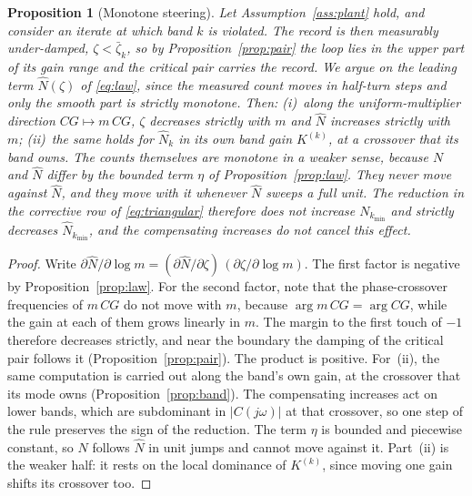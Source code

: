 \documentclass[final,3p,times,twocolumn]{elsarticle}
\newcommand{\fix}[1]{#1}  %
\newtheorem{proposition}{Proposition}
\begin{document}
\begin{proposition}[Monotone steering]\label{prop:mono}
Let Assumption~\ref{ass:plant} hold, and consider an iterate at which
band $k$ is violated. The record is then measurably under-damped,
$\zeta < \bar\zeta_k$, so by Proposition~\ref{prop:pair} the loop lies in
the upper part of its gain range and the critical pair carries the
record. \fix{We argue on the leading term $\hat N(\zeta)$ of \eqref{eq:law},
since the measured count moves in half-turn steps and only the smooth
part is strictly monotone.} Then: (i)~along the uniform-multiplier
direction $CG \mapsto m\,CG$, \fix{$\zeta$ decreases strictly with $m$
and $\hat N$ increases strictly with $m$};
(ii)~\fix{the same holds for $\hat N_k$ in} its own band gain
$K^{(k)}$, at a crossover that its band owns. \fix{The counts
themselves are monotone in a weaker sense, because $N$ and $\hat N$
differ by the bounded term $\eta$ of Proposition~\ref{prop:law}. They
never move against $\hat N$, and they move with it whenever $\hat N$
sweeps a full unit.} The reduction in the corrective row of
\eqref{eq:triangular} therefore \fix{does not increase}
$N_{k_{\min}}$\fix{ and strictly decreases $\hat N_{k_{\min}}$}, and the
compensating increases do not cancel this effect.
\end{proposition}

\begin{proof}
Write $\partial \fix{\hat N}/\partial\log m =
(\partial \fix{\hat N}/\partial\zeta)\,(\partial\zeta/\partial\log m)$.
The first factor is negative by Proposition~\ref{prop:law}. For the
second factor, note that the phase-crossover frequencies of $m\,CG$ do
not move with $m$, because $\arg m\,CG = \arg CG$, while the gain at
each of them grows linearly in $m$. The margin to the first touch of
$-1$ therefore decreases strictly, and near the boundary the damping of
the critical pair follows it (Proposition~\ref{prop:pair}). The product
is positive. For~(ii), the same computation is carried out along the
band's own gain, at the crossover that its mode owns
(Proposition~\ref{prop:band}). The compensating increases act on lower
bands, which are subdominant in $|C(j\omega)|$ at that crossover, so one
step of the rule preserves the sign of the reduction. \fix{The term
$\eta$ is bounded and piecewise constant, so $N$ follows $\hat N$ in
unit jumps and cannot move against it. Part~(ii) is the weaker half: it
rests on the local dominance of $K^{(k)}$, since moving one gain shifts
its crossover too.}
\end{proof}
\end{document}
